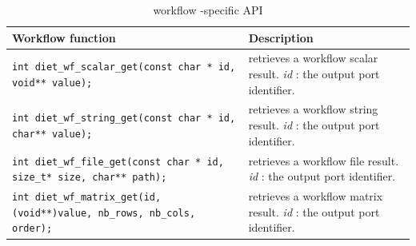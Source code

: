 \begin{table}[htbp]
  \centering
  \begin{tabular}[htbp]{|p{8cm}|p{7.5cm}|}\hline
    Workflow function & Description \\\hline
    \texttt{int   \newline
      diet\_wf\_scalar\_get(const char * id, void** value);}
    &
    retrieves a workflow scalar result. \newline
    \textit{id} : the output port identifier.
    \\\hline
    \texttt{int   \newline
      diet\_wf\_string\_get(const char * id, char** value);}
    &
    retrieves a workflow string result. \newline
    \textit{id} : the output port identifier.
    \\\hline
    \texttt{int    \newline
      diet\_wf\_file\_get(const char * id, size\_t* size, char** path);}
    &
    retrieves a workflow file result. \newline
    \textit{id} : the output port identifier.
    \\\hline
    \texttt{int    \newline
      diet\_wf\_matrix\_get(id, (void**)value, nb\_rows, nb\_cols, order);}
    &
    retrieves a workflow matrix result. \newline
    \textit{id} : the output port identifier.
    \\\hline
  \end{tabular}
  \caption{\diet workflow \DAG-specific API}
  \label{tab::wf_dag_api}
\end{table}

